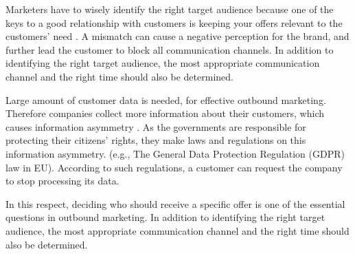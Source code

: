 \documentclass[11pt]{article}
\begin{document}


Marketers have to wisely identify the right target audience because one of the keys to a good relationship with customers is keeping your offers relevant to the customers’ need \citep{malthouse}. A mismatch can cause a negative perception for the brand, and further lead the customer to block all communication channels.  In addition to identifying the right target audience, the most appropriate communication channel and the right time should also be determined.


Large amount of customer data is needed, for effective outbound marketing. Therefore companies collect more information about their customers, which causes information asymmetry \citep{waerdt}. As the governments are responsible for protecting their citizens’ rights, they make laws and regulations on this information asymmetry. (e.g., The General Data Protection Regulation (GDPR) law in EU). According to such regulations, a customer can request the company to stop processing its data.

In this respect, deciding who should receive a specific offer is one of the essential questions in outbound marketing. In addition to identifying the right target audience, the most appropriate communication channel and the right time should also be determined.
\end{document}
